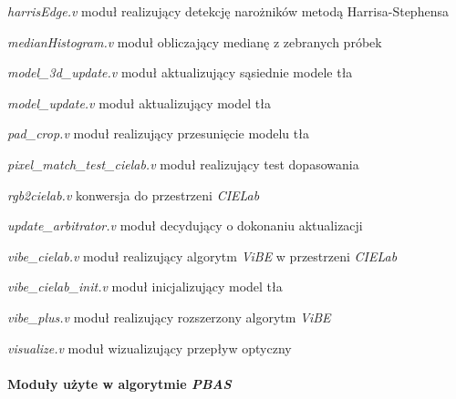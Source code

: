 \begin{eqwhere}[5cm]
    \item[\textit{harrisEdge.v}] moduł realizujący detekcję narożników metodą Harrisa-Stephensa
    \item[\textit{medianHistogram.v}] moduł obliczający medianę z zebranych próbek
    \item[\textit{model\_3d\_update.v}] moduł aktualizujący sąsiednie modele tła
    \item[\textit{model\_update.v}] moduł aktualizujący model tła
    \item[\textit{pad\_crop.v}] moduł realizujący przesunięcie modelu tła    
    \item[\textit{pixel\_match\_test\_cielab.v}] moduł realizujący test dopasowania
    \item[\textit{rgb2cielab.v}] konwersja do przestrzeni \textit{CIELab}
    \item[\textit{update\_arbitrator.v}] moduł decydujący o dokonaniu aktualizacji
    \item[\textit{vibe\_cielab.v}] moduł realizujący algorytm \textit{ViBE} w przestrzeni \textit{CIELab}
    \item[\textit{vibe\_cielab\_init.v}] moduł inicjalizujący model tła
    \item[\textit{vibe\_plus.v}] moduł realizujący rozszerzony algorytm \textit{ViBE}
    \item[\textit{visualize.v}] moduł wizualizujący przepływ optyczny
\end{eqwhere}

\paragraph*{Moduły użyte w algorytmie \textit{PBAS}}

